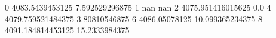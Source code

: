 0 4083.5439453125 7.592529296875
1 nan nan
2 4075.951416015625 0.0
4 4079.759521484375 3.80810546875
6 4086.05078125 10.099365234375
8 4091.184814453125 15.2333984375
